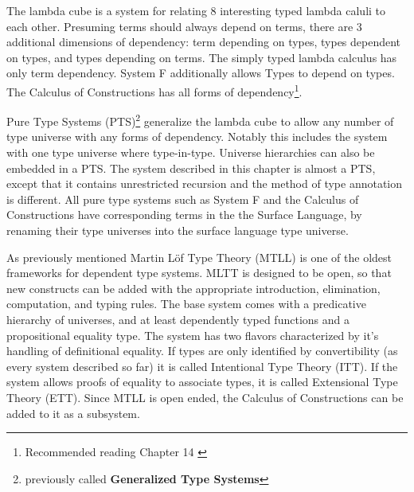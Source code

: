 The lambda cube is a system for relating 8 interesting typed lambda
caluli to each other. Presuming terms should always depend on terms,
there are 3 additional dimensions of dependency: term depending on
types, types dependent on types, and types depending on terms. The
simply typed lambda calculus has only term dependency. System F additionally
allows Types to depend on types. The Calculus of Constructions has
all forms of dependency\footnote{Recommended reading Chapter 14 \cite{sorensen2006lectures}}.


Pure Type Systems (PTS)\footnote{previously called \textbf{Generalized Type Systems}}
generalize the lambda cube to allow any number of type universe with
any forms of dependency. Notably this includes the system with one
type universe where type-in-type. Universe hierarchies can also be
embedded in a PTS. The system described in this chapter is almost
a PTS, except that it contains unrestricted recursion and the method
of type annotation is different. All pure type systems such as System
F and the Calculus of Constructions have corresponding terms in the
the Surface Language, by renaming their type universes into the surface
language type universe. 


As previously mentioned Martin L{\"o}f Type Theory (MTLL) \cite{Martin-Lof-1972}
is one of the oldest frameworks for dependent type systems. MLTT is
designed to be open, so that new constructs can be added with the
appropriate introduction, elimination, computation, and typing rules.
The base system comes with a predicative hierarchy of universes, and
at least dependently typed functions and a propositional equality
type. The system has two flavors characterized by it's handling of
definitional equality. If types are only identified by convertibility
(as every system described so far) it is called Intentional Type Theory
(ITT). If the system allows proofs of equality to associate types,
it is called Extensional Type Theory (ETT). Since MTLL is open ended,
the Calculus of Constructions can be added to it as a subsystem\cite{aspinall2004dependent,hofmann1997extensional}.



